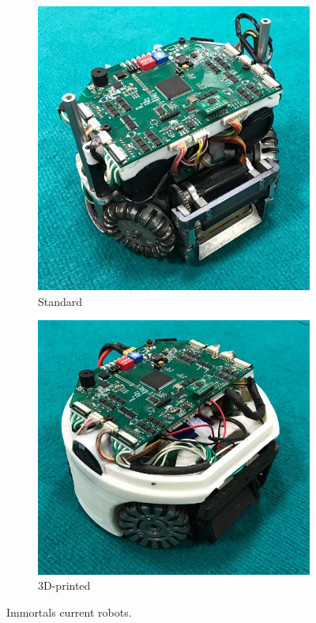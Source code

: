 \documentclass[runningheads]{llncs}
\begin{document}
\begin{figure}
    \centering
    \begin{subfigure}[b]{0.45\textwidth}
         \centering
         \includegraphics[width=\textwidth]{images/std_robot.jpeg}
         \caption{Standard}
         \label{fig:robot_std}
    \end{subfigure}
    \hfill
    \begin{subfigure}[b]{0.5\textwidth}
        \centering
        \includegraphics[width=\textwidth]{images/printed_robot.jpeg}
        \caption{3D-printed}
        \label{fig:robot_printed}
    \end{subfigure}
    \caption{Immortals current robots.}
    \label{fig:robots}
\end{figure}
\end{document}
